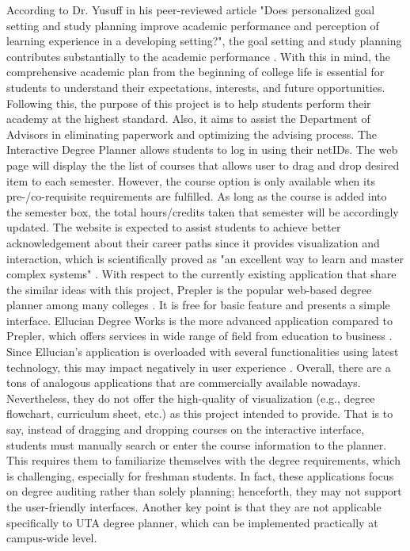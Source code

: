 
According to Dr. Yusuff in his peer-reviewed article "Does personalized goal setting and study planning improve academic performance and perception of learning experience in a developing setting?", the goal setting and study planning contributes substantially to the academic performance \cite{YUSUFF2018232}. With this in mind, the comprehensive academic plan from the beginning of college life is essential for students to understand their expectations, interests, and future opportunities. Following this, the purpose of this project is to help students perform their academy at the highest standard. Also, it aims to assist the Department of Advisors in eliminating paperwork and optimizing the advising process. The Interactive Degree Planner allows students to log in using their netIDs. The web page will display the the list of courses that allows user to drag and drop desired item to each semester. However, the course option is only available when its pre-/co-requisite requirements are fulfilled. As long as the course is added into the semester box, the total hours/credits taken that semester will be accordingly updated. The website is expected to assist students to achieve better acknowledgement about their career paths since it provides visualization and interaction, which is scientifically proved as "an excellent way to learn and master complex systems" \cite{bobek_creating_2016}.
With respect to the currently existing application that share the similar ideas with this project, Prepler is the popular web-based degree planner among many colleges \cite{prepler_prepler_nodate}. It is free for basic feature and presents a simple interface. Ellucian Degree Works is the more advanced application compared to Prepler, which offers services in wide range of field from education to business \cite{noauthor_unifying_nodate}. Since Ellucian's application is overloaded with several functionalities using latest technology, this may impact negatively in user experience \cite{noauthor_improve_nodate}. Overall, there are a tons of analogous applications that are commercially available nowadays. Nevertheless, they do not offer the high-quality of visualization (e.g., degree flowchart, curriculum sheet, etc.) as this project intended to provide. That is to say, instead of dragging and dropping courses on the interactive interface, students must manually search or enter the course information to the planner. This requires them to familiarize themselves with the degree requirements, which is challenging, especially for freshman students. In fact, these applications focus on degree auditing rather than solely planning; henceforth, they may not support the user-friendly interfaces. Another key point is that they are not applicable specifically to UTA degree planner, which can be implemented practically at campus-wide level.